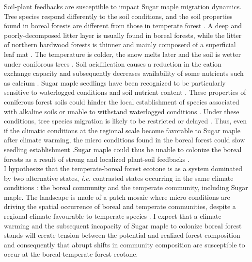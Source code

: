 Soil-plant feedbacks are susceptible to impact Sugar maple migration dynamics.
Tree species respond differently to the soil conditions, and the soil
properties found in boreal forests are different from those in temperate
forest \cite{Lafleur2010,Barras1998,Goldblum2010,Demers1998}. A deep and
poorly-decomposed litter layer is usually found in boreal forests, while the
litter of  northern hardwood forests is thinner and mainly composerd of a
superficial leaf mat \cite{Barras1998}. The temperature is colder, the snow
melts later and the soil is wetter under coniforous trees
\cite{Lafleur2010,Goldblum2010}. Soil acidification causes a reduction in the
cation exchange capacity and subsequently decreases availability of some
nutrients such as calcium \cite{Moore2008}. Sugar maple seedlings have been
recognized to be particularly sensitive to waterlogged conditions and soil
nutrient content \cite{Moore2008,Lafleur2010,Cleavitt2011}. These properties
of coniferous forest soils could hinder the local establishment of species
associated with alkaline soils or unable to withstand waterlogged conditions
\cite{Lafleur2010}. Under these conditions, tree species migration is likely
to be restricted or delayed \cite{Lafleur2010}. Thus, even if the climatic
conditions at the regional scale become favorable to Sugar maple after climate
warming, the micro conditions found in the boreal forest could slow seedling
establishment \cite{Kellman2004,Moore2008,Barras1998,Messier2011}.Sugar maple
could thus be unable to colonize the boreal forests as a result of strong and
localized plant-soil feedbacks \cite{McCarthyNeumann2012}.\\

I hypothesize that the temperate-boreal forest ecotone is as a system
dominated by two alternative states, \textit{i.e.} contrasted states occurring
in the same climate conditions \cite{scheffer2009critical}: the boreal
community and the temperate community, including Sugar maple. The landscape is
made of a patch mosaic where micro conditions are driving the spatial
occurrence of boreal and temperate communities, despite a regional climate
favourable to temperate species \cite{Goldblum2010,Fisichelli2013}. I expect
that a climate warming and the subsequent incapacity of Sugar maple to
colonize boreal forest stands will create  tension between the potential and
realized forest composition and consequently that abrupt shifts in community
composition are susceptible to occur at the boreal-temperate forest ecotone.\\


